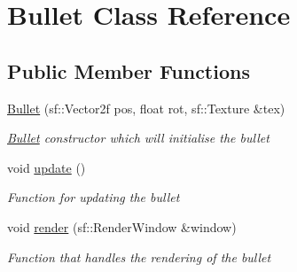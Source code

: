 \hypertarget{class_bullet}{}\section{Bullet Class Reference}
\label{class_bullet}
\subsection*{Public Member Functions}
\begin{DoxyCompactItemize}
\item 
\mbox{\hyperlink{class_bullet_ad019c3e21e52268d22a511a8b37bf09f}{Bullet}} (sf\+::\+Vector2f pos, float rot, sf\+::\+Texture \&tex)
\begin{DoxyCompactList}\small\item\em \mbox{\hyperlink{class_bullet}{Bullet}} constructor which will initialise the bullet \end{DoxyCompactList}\item 
void \mbox{\hyperlink{class_bullet_a32f4a0611fe2dd245fee955d14ca1f68}{update}} ()
\begin{DoxyCompactList}\small\item\em Function for updating the bullet \end{DoxyCompactList}\item 
void \mbox{\hyperlink{class_bullet_acea71a980a81ac7da86099d2aa9d433c}{render}} (sf\+::\+Render\+Window \&window)
\begin{DoxyCompactList}\small\item\em Function that handles the rendering of the bullet \end{DoxyCompactList}\end{DoxyCompactItemize}
